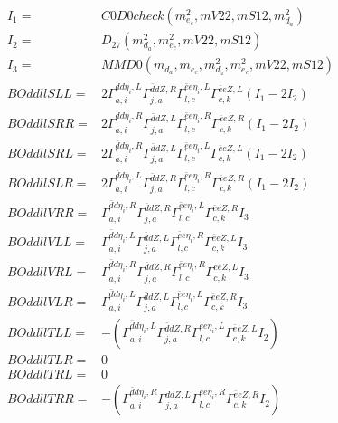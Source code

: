 \documentclass[A4,landscape]{article}
\begin{document}
\begin{align} 
I_1 = & C0D0check(m^2_{e_{{c}}}, mV22, mS12, m^2_{d_{{a}}}) \\ 
I_2 = & D_{27}(m^2_{d_{{a}}}, m^2_{e_{{c}}}, mV22, mS12) \\ 
I_3 = & MMD0(m_{d_{{a}}}, m_{e_{{c}}}, m^2_{d_{{a}}}, m^2_{e_{{c}}}, mV22, mS12) \\ 
  BOddllSLL= & 2  \Gamma^{\bar{d}d \eta_i ,L}_{a, i} \Gamma^{\bar{d}d Z ,R}_{j, a} \Gamma^{\bar{e}e \eta_i ,L}_{l, c} \Gamma^{\bar{e}e Z ,L}_{c, k} (I_1 - 2 I_2) \\ 
  BOddllSRR= & 2  \Gamma^{\bar{d}d \eta_i ,R}_{a, i} \Gamma^{\bar{d}d Z ,L}_{j, a} \Gamma^{\bar{e}e \eta_i ,R}_{l, c} \Gamma^{\bar{e}e Z ,R}_{c, k} (I_1 - 2 I_2) \\ 
  BOddllSRL= & 2  \Gamma^{\bar{d}d \eta_i ,R}_{a, i} \Gamma^{\bar{d}d Z ,L}_{j, a} \Gamma^{\bar{e}e \eta_i ,L}_{l, c} \Gamma^{\bar{e}e Z ,L}_{c, k} (I_1 - 2 I_2) \\ 
  BOddllSLR= & 2  \Gamma^{\bar{d}d \eta_i ,L}_{a, i} \Gamma^{\bar{d}d Z ,R}_{j, a} \Gamma^{\bar{e}e \eta_i ,R}_{l, c} \Gamma^{\bar{e}e Z ,R}_{c, k} (I_1 - 2 I_2) \\ 
  BOddllVRR= &  \Gamma^{\bar{d}d \eta_i ,R}_{a, i} \Gamma^{\bar{d}d Z ,R}_{j, a} \Gamma^{\bar{e}e \eta_i ,L}_{l, c} \Gamma^{\bar{e}e Z ,R}_{c, k} I_3 \\ 
  BOddllVLL= &  \Gamma^{\bar{d}d \eta_i ,L}_{a, i} \Gamma^{\bar{d}d Z ,L}_{j, a} \Gamma^{\bar{e}e \eta_i ,R}_{l, c} \Gamma^{\bar{e}e Z ,L}_{c, k} I_3 \\ 
  BOddllVRL= &  \Gamma^{\bar{d}d \eta_i ,R}_{a, i} \Gamma^{\bar{d}d Z ,R}_{j, a} \Gamma^{\bar{e}e \eta_i ,R}_{l, c} \Gamma^{\bar{e}e Z ,L}_{c, k} I_3 \\ 
  BOddllVLR= &  \Gamma^{\bar{d}d \eta_i ,L}_{a, i} \Gamma^{\bar{d}d Z ,L}_{j, a} \Gamma^{\bar{e}e \eta_i ,L}_{l, c} \Gamma^{\bar{e}e Z ,R}_{c, k} I_3 \\ 
  BOddllTLL= & -( \Gamma^{\bar{d}d \eta_i ,L}_{a, i} \Gamma^{\bar{d}d Z ,R}_{j, a} \Gamma^{\bar{e}e \eta_i ,L}_{l, c} \Gamma^{\bar{e}e Z ,L}_{c, k} I_2) \\ 
  BOddllTLR= & 0 \\ 
  BOddllTRL= & 0 \\ 
  BOddllTRR= & -( \Gamma^{\bar{d}d \eta_i ,R}_{a, i} \Gamma^{\bar{d}d Z ,L}_{j, a} \Gamma^{\bar{e}e \eta_i ,R}_{l, c} \Gamma^{\bar{e}e Z ,R}_{c, k} I_2) \\ 
\end{align} 
\end{document}
